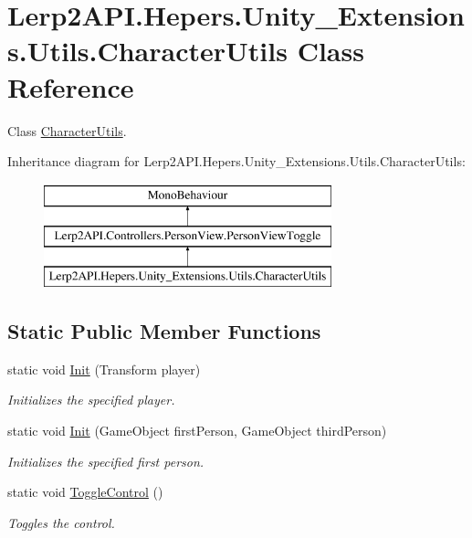 \hypertarget{class_lerp2_a_p_i_1_1_hepers_1_1_unity___extensions_1_1_utils_1_1_character_utils}{}\section{Lerp2\+A\+P\+I.\+Hepers.\+Unity\+\_\+\+Extensions.\+Utils.\+Character\+Utils Class Reference}
\label{class_lerp2_a_p_i_1_1_hepers_1_1_unity___extensions_1_1_utils_1_1_character_utils}


Class \hyperlink{class_lerp2_a_p_i_1_1_hepers_1_1_unity___extensions_1_1_utils_1_1_character_utils}{Character\+Utils}.  


Inheritance diagram for Lerp2\+A\+P\+I.\+Hepers.\+Unity\+\_\+\+Extensions.\+Utils.\+Character\+Utils\+:\begin{figure}[H]
\begin{center}
\leavevmode
\includegraphics[height=3.000000cm]{class_lerp2_a_p_i_1_1_hepers_1_1_unity___extensions_1_1_utils_1_1_character_utils}
\end{center}
\end{figure}
\subsection*{Static Public Member Functions}
\begin{DoxyCompactItemize}
\item 
static void \hyperlink{class_lerp2_a_p_i_1_1_hepers_1_1_unity___extensions_1_1_utils_1_1_character_utils_aec64db87650680b8265782154ac5ea69}{Init} (Transform player)
\begin{DoxyCompactList}\small\item\em Initializes the specified player. \end{DoxyCompactList}\item 
static void \hyperlink{class_lerp2_a_p_i_1_1_hepers_1_1_unity___extensions_1_1_utils_1_1_character_utils_ae9dbd4755dcc129539320789dc15a52b}{Init} (Game\+Object first\+Person, Game\+Object third\+Person)
\begin{DoxyCompactList}\small\item\em Initializes the specified first person. \end{DoxyCompactList}\item 
static void \hyperlink{class_lerp2_a_p_i_1_1_hepers_1_1_unity___extensions_1_1_utils_1_1_character_utils_aab81f65cd6679525d819c48df27abbdc}{Toggle\+Control} ()
\begin{DoxyCompactList}\small\item\em Toggles the control. \end{DoxyCompactList}\end{DoxyCompactItemize}
